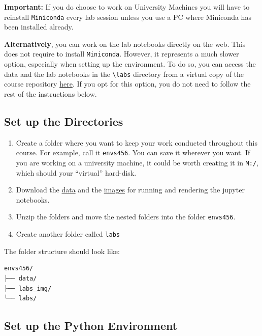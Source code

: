 \documentclass[
  letterpaper,
  DIV=11,
  numbers=noendperiod]{scrreprt}
\providecommand{\tightlist}{%
  \setlength{\itemsep}{0pt}\setlength{\parskip}{0pt}}\usepackage{longtable,booktabs,array}
\begin{document}
\textbf{Important:} If you do choose to work on University Machines you
will have to reinstall \texttt{Miniconda} every lab session unless you
use a PC where Miniconda has been installed already.

\textbf{Alternatively}, you can work on the lab notebooks directly on
the web. This does not require to install \texttt{Miniconda}. However,
it represents a much slower option, especially when setting up the
environment. To do so, you can access the data and the lab notebooks in
the \texttt{\textbackslash{}labs} directory from a virtual copy of the
course repository
\href{https://mybinder.org/v2/gh/GDSL-UL/wma/HEAD}{here}. If you opt for
this option, you do not need to follow the rest of the instructions
below.

\subsection*{Set up the Directories}\label{set-up-the-directories}

\begin{enumerate}
\def\labelenumi{\arabic{enumi}.}
\tightlist
\item
  Create a folder where you want to keep your work conducted throughout
  this course. For example, call it \texttt{envs456}. You can save it
  wherever you want. If you are working on a university machine, it
  could be worth creating it in \texttt{M:/}, which should your
  ``virtual'' hard-disk.
\item
  Download the
  \href{https://minhaskamal.github.io/DownGit/\#/home?url=https://github.com/GDSL-UL/wma/tree/main/data}{data}
  and the
  \href{https://minhaskamal.github.io/DownGit/\#/home?url=https://github.com/GDSL-UL/wma/tree/main/labs_img}{images}
  for running and rendering the jupyter notebooks.
\item
  Unzip the folders and move the nested folders into the folder
  \texttt{envs456}.
\item
  Create another folder called \texttt{labs}
\end{enumerate}

The folder structure should look like:

\begin{verbatim}
envs456/
├── data/
├── labs_img/
└── labs/
\end{verbatim}

\subsection*{Set up the Python
Environment}\label{set-up-the-python-environment}
\end{document}
